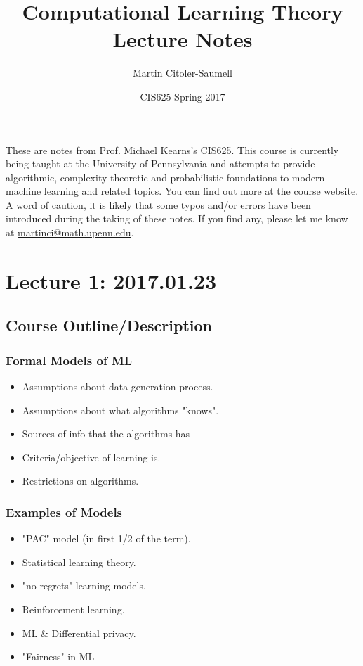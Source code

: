 \documentclass[12pt, letterpaper]{article}
\title{Computational Learning Theory Lecture Notes}
\author{Martin Citoler-Saumell}
\date{CIS625 Spring 2017}
\numberwithin{equation}{section} %
\theoremstyle{definition}
\theoremstyle{remark}
\begin{document}
\maketitle

These are notes from \href{http://www.cis.upenn.edu/~mkearns/}{Prof. Michael Kearns}'s CIS625. 
This course is currently being taught at the University of Pennsylvania and attempts to provide algorithmic, complexity-theoretic and probabilistic foundations to modern machine learning and related topics.
 You can find out more at the \href{http://www.cis.upenn.edu/~mkearns/teaching/COLT/}{course website}. 
 A word of caution, it is likely that some typos and/or errors have been introduced during the taking of these notes. If you find any, please let me know at \href{mailto:martinci@math.upenn.edu}{martinci@math.upenn.edu}.

\section{Lecture 1: 2017.01.23}

\subsection{Course Outline/Description}

\subsubsection{Formal Models of ML}

\begin{itemize}
	\item Assumptions about data generation process.
	\item Assumptions about what algorithms "knows".
	\item Sources of info that the algorithms has
	\item Criteria/objective of learning is.
	\item Restrictions on algorithms.
\end{itemize}
	
\subsubsection{Examples of Models}

\begin{itemize}
	\item "PAC" model (in first 1/2 of the term).
	\item Statistical learning theory.
	\item "no-regrets" learning models.
	\item Reinforcement learning.
	\item ML \& Differential privacy.
	\item "Fairness" in ML
\end{itemize}
\end{document}
